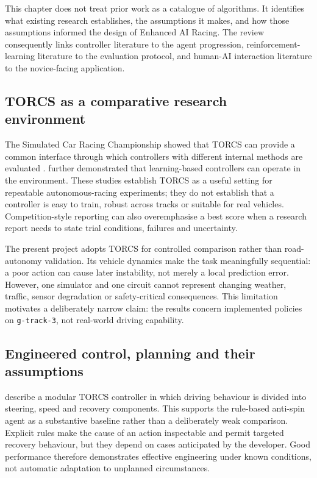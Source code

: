 This chapter does not treat prior work as a catalogue of algorithms. It identifies what existing research establishes, the assumptions it makes, and how those assumptions informed the design of Enhanced AI Racing. The review consequently links controller literature to the agent progression, reinforcement-learning literature to the evaluation protocol, and human-AI interaction literature to the novice-facing application.

\subsection{TORCS as a comparative research environment}

The Simulated Car Racing Championship showed that TORCS can provide a common interface through which controllers with different internal methods are evaluated \parencite{loiacono2010}. \textcite{cardamone2010} further demonstrated that learning-based controllers can operate in the environment. These studies establish TORCS as a useful setting for repeatable autonomous-racing experiments; they do not establish that a controller is easy to train, robust across tracks or suitable for real vehicles. Competition-style reporting can also overemphasise a best score when a research report needs to state trial conditions, failures and uncertainty.

The present project adopts TORCS for controlled comparison rather than road-autonomy validation. Its vehicle dynamics make the task meaningfully sequential: a poor action can cause later instability, not merely a local prediction error. However, one simulator and one circuit cannot represent changing weather, traffic, sensor degradation or safety-critical consequences. This limitation motivates a deliberately narrow claim: the results concern implemented policies on \texttt{g-track-3}, not real-world driving capability.

\subsection{Engineered control, planning and their assumptions}

\textcite{onieva2009} describe a modular TORCS controller in which driving behaviour is divided into steering, speed and recovery components. This supports the rule-based anti-spin agent as a substantive baseline rather than a deliberately weak comparison. Explicit rules make the cause of an action inspectable and permit targeted recovery behaviour, but they depend on cases anticipated by the developer. Good performance therefore demonstrates effective engineering under known conditions, not automatic adaptation to unplanned circumstances.

